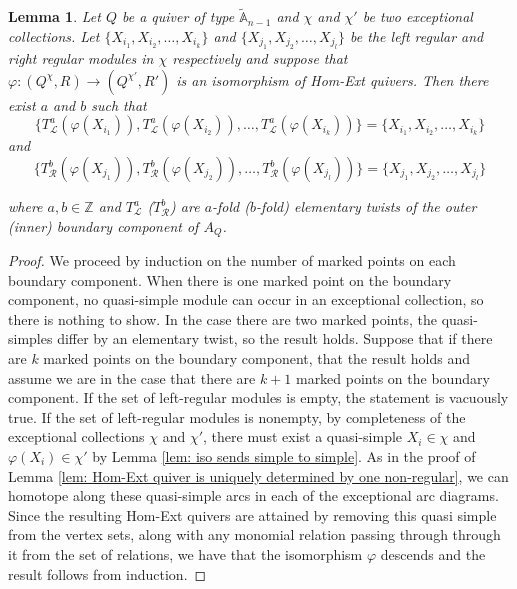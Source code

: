 \documentclass[12pt]{amsart}
\theoremstyle{plain}
\newtheorem{lem}[thm]{Lemma}
\theoremstyle{definition}
\theoremstyle{remark}
\begin{document}
\begin{lem}\label{lem: regulars twist to eachother}
    Let $Q$ be a quiver of type $\tilde{\mathbb{A}}_{n-1}$ and $\chi$ and $\chi'$ be two exceptional collections. Let $\{X_{i_1}, X_{i_2}, \dots, X_{i_k}\}$ and $\{X_{j_1}, X_{j_2}, \dots, X_{j_l}\}$ be the left regular and right regular modules in $\chi$ respectively and suppose that $\varphi: (Q^{\chi},R) \rightarrow (Q^{
\chi'},R')$ is an isomorphism of Hom-Ext quivers. Then there exist $a$ and $b$ such that $$\{T_{\mathcal{L}}^a(\varphi
(X_{i_1})), T_{\mathcal{L}}^a(\varphi(X_{i_2})), \dots, T_{\mathcal{L}}^a(\varphi(X_{i_k}))\} = \{X_{i_1}, X_{i_2}, \dots, X_{i_k}\}$$ and $$\{T_{\mathcal{R}}^b(\varphi(X_{j_1})), T_{\mathcal{R}}^b(\varphi
(X_{j_2})), \dots, T_{\mathcal{R}}^b(\varphi(X_{j_l}))\} = \{X_{j_1}, X_{j_2}, \dots, X_{j_l}\}$$

\noindent
where $a,b \in \mathbb{Z}$ {\color{black} and $T^a_{\mathcal{L}}$ ($T^b_{\mathcal{R}}$) are $a$-fold ($b$-fold) elementary twists of the outer (inner) boundary component of $A_{Q}$.} 
\end{lem}

\begin{proof}
    We proceed by induction on the number of marked points on each boundary component. When there is one marked point on the boundary component, no quasi-simple module can occur in an exceptional collection, so there is nothing to show. In the case there are two marked points, the quasi-simples differ by an elementary twist, so the result holds. Suppose that if there are $k$ marked points on the boundary component, that the result holds and assume we are in the case that there are $k+1$ marked points on the boundary component. If the set of left-regular modules is empty, the statement is vacuously true. If the set of left-regular modules is nonempty, by completeness of the exceptional collections $\chi$ and $\chi'$, there must exist a quasi-simple $X_i\in\chi$ and $\varphi(X_i) \in \chi'$ by Lemma \ref{lem: iso sends simple to simple}. As in the proof of Lemma \ref{lem: Hom-Ext quiver is uniquely determined by one non-regular}, we can homotope along these quasi-simple arcs in each of the exceptional arc diagrams. Since the resulting Hom-Ext quivers are attained by removing this quasi simple from the vertex sets, along with any monomial relation passing through through it from the set of relations, we have that the isomorphism $\varphi$ descends and the result follows from induction. 
\end{proof}
\end{document}
